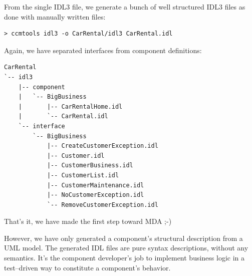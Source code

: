 \newpage
From the single IDL3 file, we generate a bunch of well structured 
IDL3 files as done with manually written files:
\begin{small}
\begin{verbatim}
> ccmtools idl3 -o CarRental/idl3 CarRental.idl
\end{verbatim}
\end{small}

Again, we have separated interfaces from component definitions:
\begin{small}
\begin{verbatim}
CarRental
`-- idl3
    |-- component
    |   `-- BigBusiness
    |       |-- CarRentalHome.idl
    |       `-- CarRental.idl
    `-- interface
        `-- BigBusiness
            |-- CreateCustomerException.idl
            |-- Customer.idl
            |-- CustomerBusiness.idl
            |-- CustomerList.idl
            |-- CustomerMaintenance.idl
            |-- NoCustomerException.idl
            `-- RemoveCustomerException.idl
\end{verbatim}
\end{small}

That's it, we have made the first step toward MDA ;-)

However, we have only generated a component's structural description from
a UML model. The generated IDL files are pure syntax descriptions, without 
any semantics.  
It's the component developer's job to implement business logic 
in a test--driven way to constitute a component's behavior.
